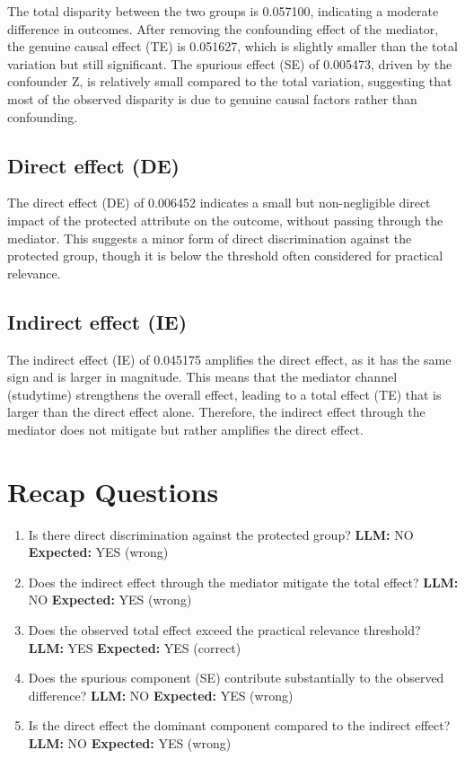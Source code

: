 \documentclass[11pt]{article}
\begin{document}
The total disparity between the two groups is 0.057100, indicating a moderate difference in outcomes. After removing the confounding effect of the mediator, the genuine causal effect (TE) is 0.051627, which is slightly smaller than the total variation but still significant. The spurious effect (SE) of 0.005473, driven by the confounder Z, is relatively small compared to the total variation, suggesting that most of the observed disparity is due to genuine causal factors rather than confounding.

\subsection{Direct effect (DE)}

The direct effect (DE) of 0.006452 indicates a small but non-negligible direct impact of the protected attribute on the outcome, without passing through the mediator. This suggests a minor form of direct discrimination against the protected group, though it is below the threshold often considered for practical relevance.

\subsection{Indirect effect (IE)}

The indirect effect (IE) of 0.045175 amplifies the direct effect, as it has the same sign and is larger in magnitude. This means that the mediator channel (studytime) strengthens the overall effect, leading to a total effect (TE) that is larger than the direct effect alone. Therefore, the indirect effect through the mediator does not mitigate but rather amplifies the direct effect.

\section{Recap Questions}

\begin{enumerate}
\item Is there direct discrimination against the protected group? \textbf{LLM:} NO \quad \textbf{Expected:} YES \quad (wrong)
\item Does the indirect effect through the mediator mitigate the total effect? \textbf{LLM:} NO \quad \textbf{Expected:} YES \quad (wrong)
\item Does the observed total effect exceed the practical relevance threshold? \textbf{LLM:} YES \quad \textbf{Expected:} YES \quad (correct)
\item Does the spurious component (SE) contribute substantially to the observed difference? \textbf{LLM:} NO \quad \textbf{Expected:} YES \quad (wrong)
\item Is the direct effect the dominant component compared to the indirect effect? \textbf{LLM:} NO \quad \textbf{Expected:} YES \quad (wrong)
\end{enumerate}
\end{document}

